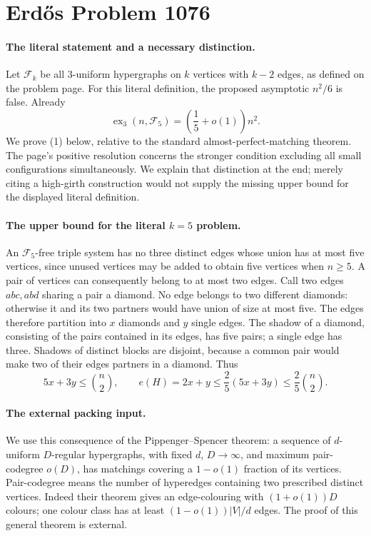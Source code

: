 \section*{Erd\H{o}s Problem 1076}

\paragraph{The literal statement and a necessary distinction.}
Let \(\mathcal F_k\) be all \(3\)-uniform hypergraphs on \(k\) vertices with \(k-2\) edges, as defined on the problem page. For this literal definition, the proposed asymptotic \(n^2/6\) is false. Already
\[
 \operatorname{ex}_3(n,\mathcal F_5)
 =\left(\frac15+o(1)\right)n^2.
 \tag{1}
\]
We prove (1) below, relative to the standard almost-perfect-matching theorem. The page's positive resolution concerns the stronger condition excluding all small configurations simultaneously. We explain that distinction at the end; merely citing a high-girth construction would not supply the missing upper bound for the displayed literal definition.

\paragraph{The upper bound for the literal \(k=5\) problem.}
An \(\mathcal F_5\)-free triple system has no three distinct edges whose union has at most five vertices, since unused vertices may be added to obtain five vertices when \(n\geq5\). A pair of vertices can consequently belong to at most two edges.
Call two edges \(abc,abd\) sharing a pair a diamond. No edge belongs to two different diamonds: otherwise it and its two partners would have union of size at most five. The edges therefore partition into \(x\) diamonds and \(y\) single edges.
The shadow of a diamond, consisting of the pairs contained in its edges, has five pairs; a single edge has three. Shadows of distinct blocks are disjoint, because a common pair would make two of their edges partners in a diamond. Thus
\[
 5x+3y\leq\binom n2,\qquad
 e(H)=2x+y\leq\frac25(5x+3y)
 \leq\frac25\binom n2.
 \tag{2}
\]

\paragraph{The external packing input.}
We use this consequence of the Pippenger--Spencer theorem: a sequence of \(d\)-uniform \(D\)-regular hypergraphs, with fixed \(d\), \(D\to\infty\), and maximum pair-codegree \(o(D)\), has matchings covering a \(1-o(1)\) fraction of its vertices. Pair-codegree means the number of hyperedges containing two prescribed distinct vertices. Indeed their theorem gives an edge-colouring with \((1+o(1))D\) colours; one colour class has at least \((1-o(1))|V|/d\) edges. The proof of this general theorem is external.

